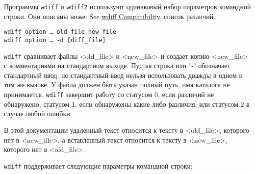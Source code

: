 Программы \texttt{wdiff} и \texttt{wdiff2} используют одинаковый набор
параметров командной строки. Они описаны ниже. See
\protect\hyperlink{wdiff-Compatibility}{wdiff Compatibility}, список
различий.

\begin{verbatim}
wdiff option … old_file new_file
wdiff option … -d [diff_file]
\end{verbatim}

\texttt{wdiff} сравнивает файлы \textless old\_file\textgreater{} и
\textless new\_file\textgreater{} и создает копию
\textless new\_file\textgreater{} с комментариями на стандартном выходе.
Пустая строка или `\texttt{-}' обозначает стандартный ввод, но
стандартный ввод нельзя использовать дважды в одном и том же вызове. У
файла должен быть указан полный путь, имя каталога не принимается.
\texttt{wdiff} завершит работу со статусом 0, если различий не
обнаружено, статусом 1, если обнаружены какие-либо различия, или
статусом 2 в случае любой ошибки.

В этой документации удаленный текст относится к тексту в
\textless old\_file\textgreater, которого нет в
\textless new\_file\textgreater, а вставленный текст относится к тексту
в \textless new\_file\textgreater, которого нет в
\textless old\_file\textgreater.

\texttt{wdiff} поддерживает следующие параметры командной строки:

